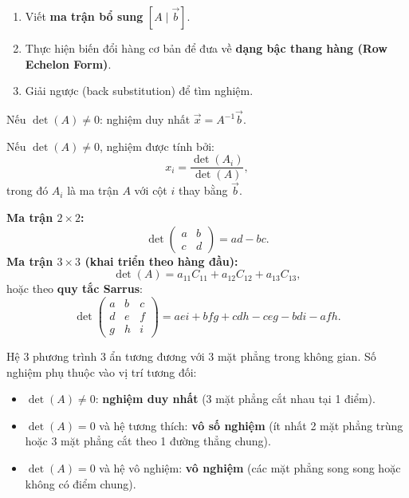 \documentclass[12pt,a4paper]{article}
\begin{document}
\begin{phuongphap}[title={Phương pháp 1: Khử Gauss (Gaussian Elimination)}]
  \begin{enumerate}
    \item Viết \textbf{ma trận bổ sung} $[A \mid \vec{b}]$.
    \item Thực hiện biến đổi hàng cơ bản để đưa về \textbf{dạng bậc thang hàng (Row Echelon Form)}.
    \item Giải ngược (back substitution) để tìm nghiệm.
  \end{enumerate}
\end{phuongphap}

\begin{phuongphap}[title={Phương pháp 2: Dùng ma trận nghịch đảo}]
  Nếu $\det(A) \ne 0$: nghiệm duy nhất $\vec{x} = A^{-1}\vec{b}$.
\end{phuongphap}

\begin{phuongphap}[title={Phương pháp 3: Quy tắc Cramer}]
  Nếu $\det(A) \ne 0$, nghiệm được tính bởi:
  \[
    x_i = \frac{\det(A_i)}{\det(A)},
  \]
  trong đó $A_i$ là ma trận $A$ với cột $i$ thay bằng $\vec{b}$.
\end{phuongphap}

\begin{dinhnghia}[title={Định thức (Determinant)}]
  \textbf{Ma trận $2 \times 2$:}
  \[
    \det\begin{pmatrix}a&b\\c&d\end{pmatrix} = ad - bc.
  \]
  \textbf{Ma trận $3 \times 3$ (khai triển theo hàng đầu):}
  \[
    \det(A) = a_{11}C_{11} + a_{12}C_{12} + a_{13}C_{13},
  \]
  hoặc theo \textbf{quy tắc Sarrus}:
  \[
    \det\begin{pmatrix}a&b&c\\d&e&f\\g&h&i\end{pmatrix} = aei + bfg + cdh - ceg - bdi - afh.
  \]
\end{dinhnghia}

\begin{congthuc}[title={Biện luận số nghiệm hệ $3 \times 3$ (ý nghĩa hình học)}]
  Hệ $3$ phương trình $3$ ẩn tương đương với $3$ mặt phẳng trong không gian. Số nghiệm phụ thuộc vào vị trí tương đối:
  \begin{itemize}
    \item $\det(A) \ne 0$: \textbf{nghiệm duy nhất} (3 mặt phẳng cắt nhau tại 1 điểm).
    \item $\det(A) = 0$ và hệ tương thích: \textbf{vô số nghiệm} (ít nhất 2 mặt phẳng trùng hoặc 3 mặt phẳng cắt theo 1 đường thẳng chung).
    \item $\det(A) = 0$ và hệ vô nghiệm: \textbf{vô nghiệm} (các mặt phẳng song song hoặc không có điểm chung).
  \end{itemize}
\end{congthuc}
\end{document}
